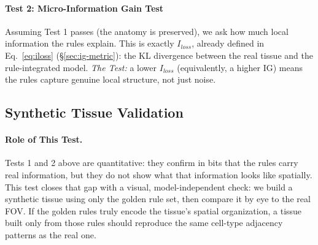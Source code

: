 \documentclass[10pt, a4paper]{article}
\begin{document}
\paragraph{Test 2: Micro-Information Gain Test}
Assuming Test 1 passes (the anatomy is preserved), we ask how much local information the rules explain. This is exactly $I_{loss}$, already defined in Eq.~\eqref{eq:iloss} (\S\ref{sec:ig-metric}): the KL divergence between the real tissue and the rule-integrated model. \textit{The Test:} a lower $I_{loss}$ (equivalently, a higher IG) means the rules capture genuine local structure, not just noise.

\subsection{Synthetic Tissue Validation}

\paragraph{Role of This Test.}
Tests 1 and 2 above are quantitative: they confirm in bits that the rules carry real information, but they do not show what that information looks like spatially. This test closes that gap with a visual, model-independent check: we build a synthetic tissue using only the golden rule set, then compare it by eye to the real FOV. If the golden rules truly encode the tissue's spatial organization, a tissue built only from those rules should reproduce the same cell-type adjacency patterns as the real one.
\end{document}
